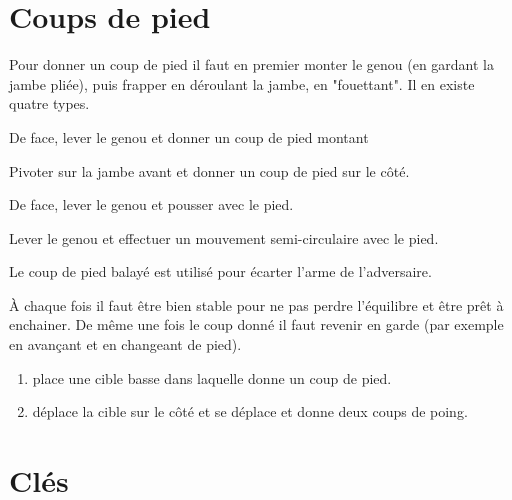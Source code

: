 \section{Coups de pied}


Pour donner un coup de pied il faut en premier monter le genou (en gardant la jambe pliée), puis frapper en déroulant la jambe, en "fouettant".
Il en existe quatre types.


\begin{coup}
	De face, lever le genou et donner un coup de pied montant
\end{coup}


\begin{coup}
	Pivoter sur la jambe avant et donner un coup de pied sur le côté.
\end{coup}


\begin{coup}
	De face, lever le genou et pousser avec le pied.
\end{coup}


\begin{coup}
	Lever le genou et effectuer un mouvement semi-circulaire avec le pied.
\end{coup}


Le coup de pied balayé est utilisé pour écarter l'arme de l'adversaire.

À chaque fois il faut être bien stable pour ne pas perdre l'équilibre et être prêt à enchainer. De même une fois le coup donné il faut revenir en garde (par exemple en avançant et en changeant de pied).


\begin{exercice}

	
	\begin{enumerate}
		\item \D place une cible basse dans laquelle \A donne un coup de pied.
		
		\item \D déplace la cible sur le côté et \A se déplace et donne deux coups de poing.
	\end{enumerate}
\end{exercice}


\section{Clés}


